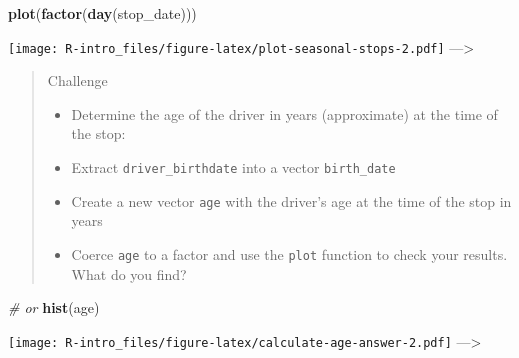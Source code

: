 \documentclass[
]{book}
\newenvironment{Shaded}{\begin{snugshade}}{\end{snugshade}}
\newcommand{\CommentTok}[1]{\textcolor[rgb]{0.56,0.35,0.01}{\textit{#1}}}
\newcommand{\KeywordTok}[1]{\textcolor[rgb]{0.13,0.29,0.53}{\textbf{#1}}}
\newcommand{\NormalTok}[1]{#1}
\providecommand{\tightlist}{%
  \setlength{\itemsep}{0pt}\setlength{\parskip}{0pt}}
\begin{document}
\begin{Shaded}
\begin{Highlighting}[]
\KeywordTok{plot}\NormalTok{(}\KeywordTok{factor}\NormalTok{(}\KeywordTok{day}\NormalTok{(stop_date)))}
\end{Highlighting}
\end{Shaded}

\texttt{[image: R-intro\_files/figure-latex/plot-seasonal-stops-2.pdf]}
---\textgreater{}

\begin{quote}
Challenge

\begin{itemize}
\tightlist
\item
  Determine the age of the driver in years (approximate) at the time of the stop:
\item
  Extract \texttt{driver\_birthdate} into a vector \texttt{birth\_date}
\item
  Create a new vector \texttt{age} with the driver's age at the time of the stop in years
\item
  Coerce \texttt{age} to a factor and use the \texttt{plot} function to check your results. What do you find?
\end{itemize}
\end{quote}

\begin{Shaded}
\begin{Highlighting}[]
\CommentTok{# or}
\KeywordTok{hist}\NormalTok{(age)}
\end{Highlighting}
\end{Shaded}

\texttt{[image: R-intro\_files/figure-latex/calculate-age-answer-2.pdf]}
---\textgreater{}

  
\end{document}
